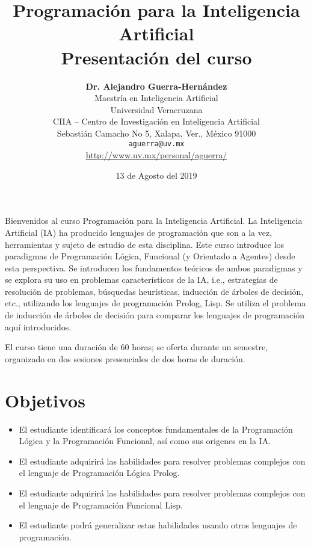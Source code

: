 \documentclass[10pt]{article}
\begin{document}
\title{\textbf{Programación para la Inteligencia Artificial} \\
  Presentación del curso}
\author{\textbf{Dr. Alejandro Guerra-Hernández} \\
  Maestría en Inteligencia Artificial \\
  Universidad Veracruzana \\
  CIIA -- Centro de Investigación en Inteligencia Artificial \\
  Sebastián Camacho
  No 5, Xalapa, Ver., México 91000 \\ \texttt{aguerra@uv.mx} \\
  \url{http://www.uv.mx/personal/aguerra/}}

\date{13 de Agosto del 2019}

\maketitle

Bienvenidos al curso Programación para la Inteligencia Artificial. La
Inteligencia Artificial (IA) ha producido lenguajes de programación
que son a la vez, herramientas y sujeto de estudio de esta
disciplina. Este curso introduce los paradigmas de Programación
Lógica, Funcional (y Orientado a Agentes) desde esta perspectiva. Se
introducen los fundamentos teóricos de ambos paradigmas y se explora
su uso en problemas característicos de la IA, i.e., estrategias de
resolución de problemas, búsquedas heurísticas, inducción de árboles
de decisión, etc., utilizando los lenguajes de programación Prolog,
Lisp. Se utiliza el problema de inducción de árboles de decisión para
comparar los lenguajes de programación aquí introducidos.

El curso tiene una duración de 60 horas; se oferta durante un
semestre, organizado en dos sesiones presenciales de dos horas de
duración. 

\section{Objetivos}
\begin{itemize}
\item El estudiante identificará los conceptos fundamentales de la
  Programación Lógica y la Programación Funcional, así como sus
  origenes en la IA.
\item El estudiante adquirirá las habilidades para resolver problemas
  complejos con el lenguaje de Programación Lógica Prolog.
\item El estudiante adquirirá las habilidades para resolver problemas
  complejos con el lenguaje de Programación Funcional Lisp.
\item El estudiante podrá generalizar estas habilidades usando otros
  lenguajes de programación.
\end{itemize}
\end{document}
